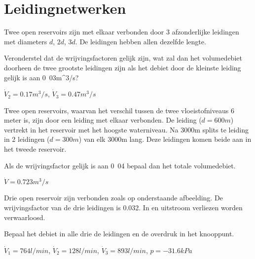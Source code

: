 \chapter{Leidingnetwerken}
\label{sec:Leidingnetwerken}
\begin{toepassing}
	\label{parallelle leidingen}
Twee open reservoirs zijn met elkaar verbonden door 3 afzonderlijke leidingen met diameters $d$, $2d$, $3d$. De leidingen hebben allen dezelfde lengte.
		
	Veronderstel dat de wrijvingsfactoren gelijk zijn, wat zal dan het volumedebiet doorheen de twee grootste leidingen zijn als het debiet door de kleinste leiding gelijk is aan \unit{0.03}{m^3/s}? 
\end{toepassing}
\begin{antwoord}
	$\dot{V}_2 = \unit{0.17}{m^3/s}$, $\dot{V}_3 = \unit{0.47}{m^3/s}$
\end{antwoord}
\begin{toepassing}
	\label{gesplitste leiding}
Twee open reservoirs, waarvan het verschil tussen de twee vloeistofniveaus 6 meter is, zijn door een leiding met elkaar verbonden. De leiding ($d=\unit{600}{m}$) vertrekt in het reservoir met het hoogste waterniveau. Na \unit{3000}{m} splits te leiding in 2 leidingen ($d=\unit{300}{m}$) van elk \unit{3000}{m} lang. Deze leidingen komen beide aan in het tweede reservoir. 
		
	Als de wrijvingsfactor gelijk is aan \unit{0.04}{} bepaal dan het totale volumedebiet. 
\end{toepassing}
\begin{antwoord}
		$\dot{V} = \unit{0.723}{m^3/s}$
\end{antwoord}
\begin{toepassing}
	\label{3_reservoirs}
Drie open reservoir zijn verbonden zoals op onderstaande afbeelding. De wrijvingsfactor van de drie leidingen is 0.032. In en uitstroom verliezen worden verwaarloosd.
		
	Bepaal het debiet in alle drie de leidingen en de overdruk in het knooppunt.
		
	\begin{center}
		
	\end{center}
\end{toepassing}
\begin{antwoord}
		$\dot{V}_1 = \unit{764}{l/min}$, $\dot{V}_2 = \unit{128}{l/min}$, $\dot{V}_3 = \unit{893}{l/min}$, $p=\unit{-31.6}{kPa}$
\end{antwoord}
